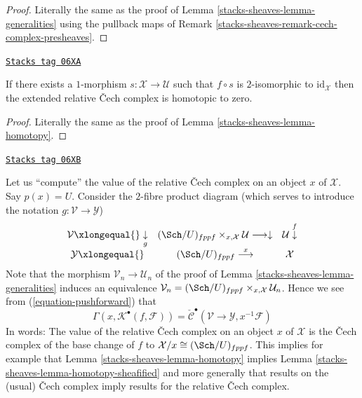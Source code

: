 \begin{proof}
Literally the same as the proof of
Lemma \ref{stacks-sheaves-lemma-generalities}
using the pullback maps of
Remark \ref{stacks-sheaves-remark-cech-complex-presheaves}.
\end{proof}

\begin{lemma}
\label{stacks-sheaves-lemma-homotopy-sheafified}
\href{https://stacks.math.columbia.edu/tag/06XA}{\texttt{Stacks tag 06XA}}

If there exists a $1$-morphism $s : \mathcal{X} \to \mathcal{U}$
such that $f \circ s$ is $2$-isomorphic to $\text{id}_\mathcal{X}$
then the extended relative {\v C}ech complex is homotopic to zero.
\end{lemma}

\begin{proof}
Literally the same as the proof of
Lemma \ref{stacks-sheaves-lemma-homotopy}.
\end{proof}

\begin{remark}
\label{stacks-sheaves-remark-cech-complex-sections}
\href{https://stacks.math.columbia.edu/tag/06XB}{\texttt{Stacks tag 06XB}}

Let us ``compute'' the value of the relative {\v C}ech complex on an
object $x$ of $\mathcal{X}$. Say $p(x) = U$.
Consider the $2$-fibre product diagram (which serves to introduce
the notation $g : \mathcal{V} \to \mathcal{Y}$)
$$
\begin{array}{ccc}\mathcal{V} \xlongequal{}\underset{g}{\downarrow} & (\Sch/U)_{fppf} \times_{x, \mathcal{X}} \mathcal{U} \longrightarrow\downarrow & \mathcal{U} \overset{f}{\downarrow} \\ \mathcal{Y} \xlongequal{} & (\Sch/U)_{fppf} \overset{x}{\longrightarrow} & \mathcal{X}\end{array}
$$
Note that the morphism $\mathcal{V}_n \to \mathcal{U}_n$ of the proof of
Lemma \ref{stacks-sheaves-lemma-generalities}
induces an equivalence
$\mathcal{V}_n =
(\Sch/U)_{fppf} \times_{x, \mathcal{X}} \mathcal{U}_n$.
Hence we see from
(\ref{equation-pushforward})
that
$$
\Gamma(x, \mathcal{K}^\bullet(f, \mathcal{F})) =
\check{\mathcal{C}}^\bullet(\mathcal{V} \to \mathcal{Y}, x^{-1}\mathcal{F})
$$
In words: The value of the relative {\v C}ech complex on an object $x$ of
$\mathcal{X}$ is the {\v C}ech complex of the base change of $f$ to
$\mathcal{X}/x \cong (\Sch/U)_{fppf}$. This implies for example that
Lemma \ref{stacks-sheaves-lemma-homotopy}
implies
Lemma \ref{stacks-sheaves-lemma-homotopy-sheafified}
and more generally that results on the (usual) {\v C}ech complex imply
results for the relative {\v C}ech complex.
\end{remark}

